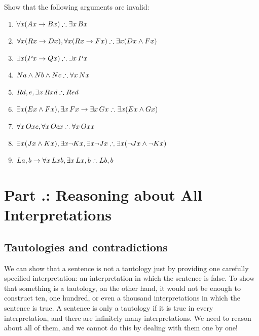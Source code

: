 \problempart
Show that the following arguments are invalid:
\begin{enumerate}
\item $\forall x(\atom{A}{x} \eif \atom{B}{x}) \therefore \exists x\, \atom{B}{x}$
\item $\forall x(\atom{R}{x} \eif \atom{D}{x}), \forall x(\atom{R}{x} \eif \atom{F}{x}) \therefore \exists x(\atom{D}{x} \eand \atom{F}{x})$
\item $\exists x(\atom{P}{x}\eif \atom{Q}{x}) \therefore \exists x\, \atom{P}{x}$
\item $\atom{N}{a} \eand \atom{N}{b} \eand \atom{N}{c} \therefore \forall x\, \atom{N}{x}$
\item $\atom{R}{d,e}, \exists x\, \atom{R}{xd} \therefore \atom{R}{ed}$
\item $\exists x(\atom{E}{x} \eand \atom{F}{x}), \exists x\, \atom{F}{x} \eif \exists x\, \atom{G}{x} \therefore \exists x(\atom{E}{x} \eand \atom{G}{x})$
\item $\forall x\, \atom{O}{xc}, \forall x\, \atom{O}{cx} \therefore \forall x\, \atom{O}{xx}$
\item $\exists x(\atom{J}{x} \eand \atom{K}{x}), \exists x \enot \atom{K}{x}, \exists x \enot \atom{J}{x} \therefore \exists x(\enot \atom{J}{x} \eand \enot \atom{K}{x})$
\item $\atom{L}{a,b} \eif \forall x\, \atom{L}{xb}, \exists x\, \atom{L}{x,b} \therefore \atom{L}{b,b}$
\end{enumerate}



\section{Part \thechapcount.\theseccount: Reasoning about All Interpretations}
\label{allinterp}
\subsection{Tautologies and contradictions}

We can show that a sentence is not a tautology just by providing one carefully specified interpretation: an interpretation in which the sentence is false. To show that something is a tautology, on the other hand, it would not be enough to construct ten, one hundred, or even a thousand interpretations in which the sentence is true. A sentence is only a tautology if it is true in every interpretation, and there are infinitely many interpretations. We need to reason about all of them, and we cannot do this by dealing with them one by one!

